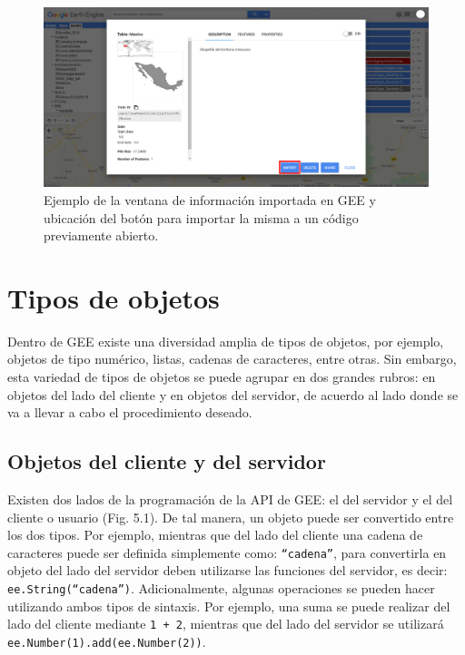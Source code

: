 \documentclass[
  12pt,
  letterpaper,
  twoside]{book}
\begin{document}
\begin{figure}[btp]

{\centering \includegraphics[width=1\linewidth]{Img/Asset_ruta2} 

}

\caption{Ejemplo de la ventana de información importada en GEE y ubicación del botón para importar la misma a un código previamente abierto.}\label{fig:unnamed-chunk-42}
\end{figure}

\newpage

\hypertarget{tipos-de-objetos}{%
\chapter{Tipos de objetos}\label{tipos-de-objetos}}

Dentro de GEE existe una diversidad amplia de tipos de objetos, por ejemplo, objetos de tipo numérico, listas, cadenas de caracteres, entre otras. Sin embargo, esta variedad de tipos de objetos se puede agrupar en dos grandes rubros: en objetos del lado del cliente y en objetos del servidor, de acuerdo al lado donde se va a llevar a cabo el procedimiento deseado.

\hypertarget{objetos-del-cliente-y-del-servidor}{%
\section{Objetos del cliente y del servidor}\label{objetos-del-cliente-y-del-servidor}}

Existen dos lados de la programación de la API de GEE: el del servidor y el del cliente o usuario (Fig. 5.1). De tal manera, un objeto puede ser convertido entre los dos tipos. Por ejemplo, mientras que del lado del cliente una cadena de caracteres puede ser definida simplemente como: \texttt{“cadena”}, para convertirla en objeto del lado del servidor deben utilizarse las funciones del servidor, es decir: \texttt{ee.String(“cadena”)}. Adicionalmente, algunas operaciones se pueden hacer utilizando ambos tipos de sintaxis. Por ejemplo, una suma se puede realizar del lado del cliente mediante \texttt{1\ +\ 2}, mientras que del lado del servidor se utilizará \texttt{ee.Number(1).add(ee.Number(2))}.
\end{document}
